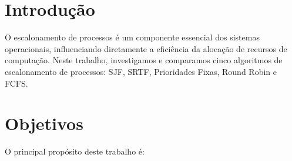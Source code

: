 \documentclass[
	12pt,				%
	openright,			%
	oneside,			%
	a4paper,			%
	chapter=TITLE,		%
	english,			%
	french,				%
	spanish,			%
	brazil				%
	]{abntex2}
\theoremstyle{definition}
\begin{document}
\frenchspacing 

\imprimircapa


\imprimirfolhaderosto

\newpage

\setlength{\absparsep}{18pt} %

\tableofcontents*
\cleardoublepage
\textual


\chapter{Introdução}

O escalonamento de processos é um componente essencial dos sistemas operacionais, 
influenciando diretamente a eficiência da alocação de recursos de computação. 
Neste trabalho, investigamos e comparamos cinco algoritmos de escalonamento de 
processos: SJF, SRTF, Prioridades Fixas, Round Robin e FCFS.

\chapter{Objetivos}

O principal propósito deste trabalho é:
\end{document}
